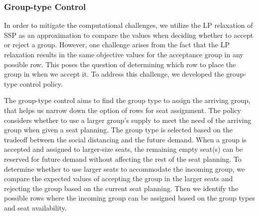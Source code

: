 \subsubsection{Group-type Control}\label{nested_policy}


In order to mitigate the computational challenges, we utilize the LP relaxation of SSP as an approximation to compare the values when deciding whether to accept or reject a group. However, one challenge arises from the fact that the LP relaxation results in the same objective values for the acceptance group in any possible row. This poses the question of determining which row to place the group in when we accept it. To address this challenge, we developed the group-type control policy.

The group-type control aims to find the group type to assign the arriving group, that helps us narrow down the option of rows for seat assignment. The policy considers whether to use a larger group's supply to meet the need of the arriving group when given a seat planning. The group type is selected based on the tradeoff between the social distancing and the future demand. When a group is accepted and assigned to larger-size seats, the remaining empty seat(s) can be reserved for future demand without affecting the rest of the seat planning. To determine whether to use larger seats to accommodate the incoming group, we compare the expected values of accepting the group in the larger seats and rejecting the group based on the current seat planning. Then we identify the possible rows where the incoming group can be assigned based on the group types and seat availability.

